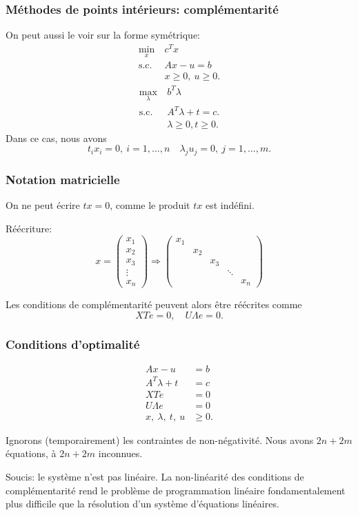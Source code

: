 \documentclass[t, aspectratio=169,usepdftitle=false]{beamer}
\begin{document}
\begin{frame}
\frametitle{Méthodes de points intérieurs: complémentarité}

On peut aussi le voir sur la forme symétrique:
\begin{align*}
\min_x\ & c^T x \\
\mbox{s.c. } & Ax - u = b \\
& x \geq 0,\ u \geq 0.
\end{align*}
\begin{align*}
\max_{\lambda} \  & b^T \lambda \\
\mbox{s.c. } & A^T \lambda  +t = c. \\
& \lambda \geq 0, t \geq 0.
\end{align*}
Dans ce cas, nous avons
\[
t_i x_i = 0,\ i = 1,\ldots,n \quad
\lambda_j u_j = 0,\ j = 1,\ldots, m.
\]

\end{frame}

\begin{frame}
\frametitle{Notation matricielle}

On ne peut écrire $tx = 0$, comme le produit $tx$ est indéfini.

\mbox{}

Réécriture:
\[
x = \begin{pmatrix}
x_1 \\ x_2 \\ x_3 \\ \vdots \\ x_n
\end{pmatrix}
\Rightarrow
\begin{pmatrix}
x_1 \\ & x_2 \\ & & x_3 \\ & & & \ddots \\ & & & & x_n
\end{pmatrix}
\]

\mbox{}

Les conditions de complémentarité peuvent alors être réécrites comme
\[
XTe = 0,\quad U\Lambda e = 0.
\]
\end{frame}

\begin{frame}
\frametitle{Conditions d'optimalité}

\begin{align*}
Ax - u &= b \\
A^T \lambda + t &= c \\
XTe &= 0\\
U\Lambda e &= 0\\
x,\ \lambda,\ t,\ u &\geq 0.
\end{align*}

\mbox{}

Ignorons (temporairement) les contraintes de non-négativité.
Nous avons $2n + 2m$ équations, à $2n + 2m$ inconnues.

\mbox{}

Soucis: le système n'est pas linéaire. La non-linéarité des conditions de complémentarité rend le problème de programmation linéaire fondamentalement plus difficile que la résolution d'un système d'équations linéaires.

\end{frame}
\end{document}
